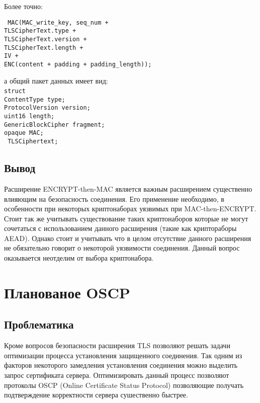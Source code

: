 Более точно: 

\texttt{
	MAC(MAC\_write\_key, seq\_num +\\
	TLSCipherText.type +\\
	TLSCipherText.version +\\
	TLSCipherText.length +\\
	IV +\\
	ENC(content + padding + padding\_length));
}

а общий пакет данных имеет вид:
\texttt{\\
	struct {\\
		ContentType type;\\
		ProtocolVersion version;\\
		uint16 length;\\
		GenericBlockCipher fragment;\\
		opaque MAC;\\
	} TLSCiphertext;
}

\subsection{Вывод}
Расширение ENCRYPT-then-MAC является важным расширением существенно влияющим на безопасность соединения. Его применение необходимо, в особенности при некоторых криптонаборах уязвимых при MAC-then-ENCRYPT. Стоит так же учитывать существование таких криптонаборов которые не могут сочетаться с использованием данного расширения (такие как криптораборы AEAD). Однако стоит и учитывать что в целом отсутствие данного расширения не обязательно говорит о некоторой уязвимости соединения. Данный вопрос оказывается неотделим от выбора криптонабора. 

\section{Планованое OSCP}

\subsection{Проблематика}
Кроме вопросов безопасности расширения TLS позволяют решать задачи оптимизации процесса установления защищенного соединения. Так одним из факторов некоторого замедления установления соединения можно выделить запрос сертификата сервера. Оптимизировать данный процесс позволяют протоколы OSCP (Online Certificate Status Protocol) позволяющие получать подтверждение корректности сервера сушественно быстрее.

